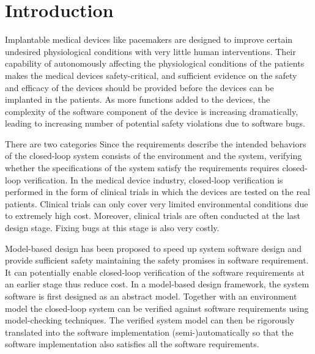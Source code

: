 \section{Introduction}
\label{introduction}

Implantable medical devices like pacemakers are designed to improve certain undesired physiological conditions with very little human interventions. Their capability of autonomously affecting the physiological conditions of the patients makes the medical devices safety-critical, and sufficient evidence on the safety and efficacy of the devices should be provided before the devices can be implanted in the patients. As more functions added to the devices, the complexity of the software component of the device is increasing dramatically, leading to increasing number of potential safety violations due to software bugs. 

There are two categories Since the requirements describe the intended behaviors of the closed-loop system consists of the environment and the system, verifying whether the specifications of the system satisfy the requirements requires closed-loop verification. 
In the medical device industry, closed-loop verification is performed in the form of clinical trials in which the devices are tested on the real patients. Clinical trials can only cover very limited environmental conditions due to extremely high cost. Moreover, clinical trials are often conducted at the last design stage. Fixing bugs at this stage is also very costly.

Model-based design has been proposed to speed up system software design and provide sufficient safety maintaining the safety promises in software requirement. It can potentially enable closed-loop verification of the software requirements at an earlier stage thus reduce cost. In a model-based design framework, the system software is first designed as an abstract model. Together with an environment model the closed-loop system can be verified against software requirements using model-checking techniques. The verified system model can then be rigorously translated into the software implementation (semi-)automatically so that the software implementation also satisfies all the software requirements.

